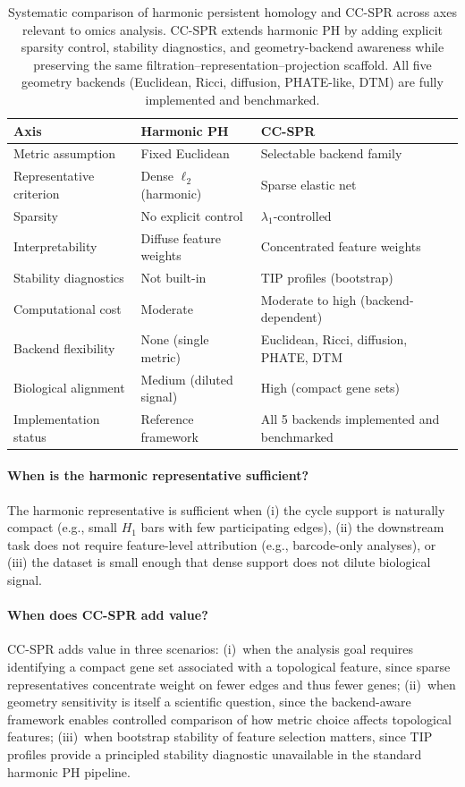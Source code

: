 \documentclass[11pt]{article}
\begin{document}
\begin{table}[h]
\centering
\small
\begin{tabular}{p{2.5cm}p{3.0cm}p{3.0cm}}
\toprule
\textbf{Axis} & \textbf{Harmonic PH} & \textbf{CC-SPR} \\
\midrule
Metric assumption & Fixed Euclidean & Selectable backend family \\
Representative criterion & Dense $\ell_2$ (harmonic) & Sparse elastic net \\
Sparsity & No explicit control & $\lambda_1$-controlled \\
Interpretability & Diffuse feature weights & Concentrated feature weights \\
Stability diagnostics & Not built-in & TIP profiles (bootstrap) \\
Computational cost & Moderate & Moderate to high (backend-dependent) \\
Backend flexibility & None (single metric) & Euclidean, Ricci, diffusion, PHATE, DTM \\
Biological alignment & Medium (diluted signal) & High (compact gene sets) \\
Implementation status & Reference framework & All 5 backends implemented and benchmarked \\
\bottomrule
\end{tabular}
\caption{Systematic comparison of harmonic persistent homology and CC-SPR across axes relevant to omics analysis.
CC-SPR extends harmonic PH by adding explicit sparsity control, stability diagnostics, and geometry-backend awareness while preserving the same filtration--representation--projection scaffold.
All five geometry backends (Euclidean, Ricci, diffusion, PHATE-like, DTM) are fully implemented and benchmarked.}
\label{tab:hphcompare}
\end{table}

\paragraph{When is the harmonic representative sufficient?}
The harmonic representative is sufficient when (i) the cycle support is naturally compact (e.g., small $H_1$ bars with few participating edges), (ii) the downstream task does not require feature-level attribution (e.g., barcode-only analyses), or (iii) the dataset is small enough that dense support does not dilute biological signal.

\paragraph{When does CC-SPR add value?}
CC-SPR adds value in three scenarios:
(i)~when the analysis goal requires identifying a compact gene set associated with a topological feature, since sparse representatives concentrate weight on fewer edges and thus fewer genes;
(ii)~when geometry sensitivity is itself a scientific question, since the backend-aware framework enables controlled comparison of how metric choice affects topological features;
(iii)~when bootstrap stability of feature selection matters, since TIP profiles provide a principled stability diagnostic unavailable in the standard harmonic PH pipeline.
\end{document}

